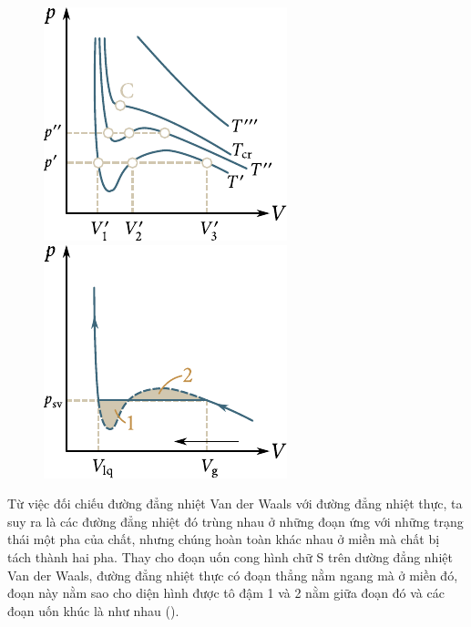 \begin{figure}[t]
	\begin{minipage}[t]{0.5\linewidth}
		\begin{center}
			\includegraphics[scale=1]{figures/ch_15/fig_15_8.pdf}
			\caption[]{}
			\label{fig:15_8}
		\end{center}
	\end{minipage}
	\hspace{-0.05cm}
	\begin{minipage}[t]{0.5\linewidth}
		\begin{center}
			\includegraphics[scale=1]{figures/ch_15/fig_15_9.pdf}
			\caption[]{}
			\label{fig:15_9}
		\end{center}
	\end{minipage}
	\vspace{-0.4cm}
\end{figure}

Từ việc đối chiếu đường đẳng nhiệt Van der Waals với đường đẳng nhiệt thực, ta suy ra là các đường đẳng nhiệt đó trùng nhau ở những đoạn ứng với những trạng thái một pha của chất, nhưng chúng hoàn toàn khác nhau ở miền mà chất bị tách thành hai pha. Thay cho đoạn uốn cong hình chữ S trên dường đẳng nhiệt Van der Waals, đường đẳng nhiệt thực có đoạn thẳng nằm ngang mà ở miền đó, đoạn này nằm sao cho diện hình được tô đậm 1 và 2 nằm giữa đoạn đó và các đoạn uốn khúc là như nhau ().\\

